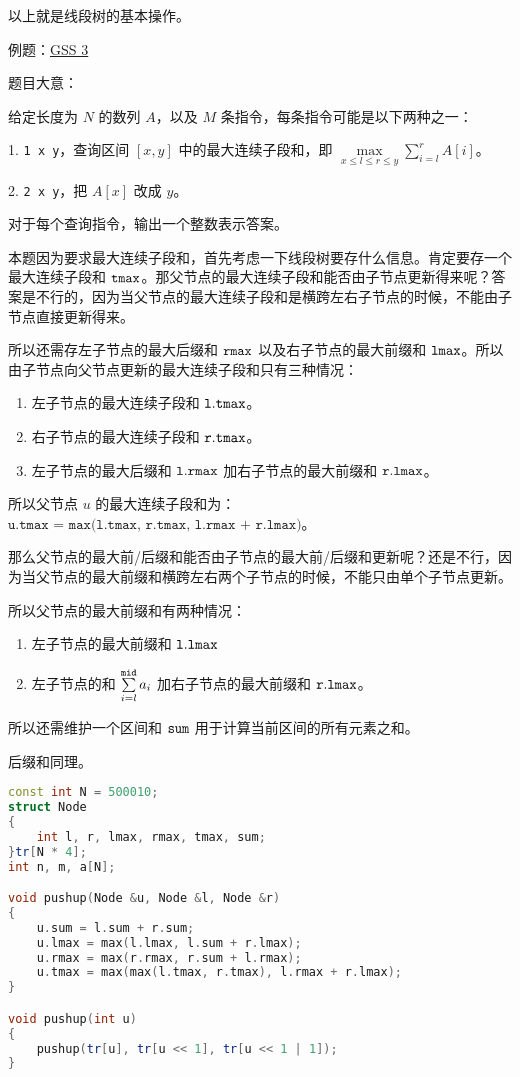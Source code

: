 以上就是线段树的基本操作。

例题：\href{https://www.spoj.com/problems/GSS3/}{GSS 3}

题目大意：

给定长度为 $N$ 的数列 $A$，以及 $M$ 条指令，每条指令可能是以下两种之一：

1.  \verb|1 x y|，查询区间 $[x,y]$ 中的最大连续子段和，即 $\max\limits_{x \le l \le r \le y}${$\sum\limits^r_{i=l} A[i]$}。

2.  \verb|2 x y|，把 $A[x]$ 改成 $y$。

对于每个查询指令，输出一个整数表示答案。


本题因为要求最大连续子段和，首先考虑一下线段树要存什么信息。肯定要存一个最大连续子段和 $\tt tmax$。那父节点的最大连续子段和能否由子节点更新得来呢？答案是不行的，因为当父节点的最大连续子段和是横跨左右子节点的时候，不能由子节点直接更新得来。

所以还需存左子节点的最大后缀和 $\tt rmax$ 以及右子节点的最大前缀和 $\tt lmax$。所以由子节点向父节点更新的最大连续子段和只有三种情况：

\begin{enumerate}
\item 左子节点的最大连续子段和 $\tt l.tmax$。
\item 右子节点的最大连续子段和 $\tt r.tmax$。
\item 左子节点的最大后缀和 $\tt l.rmax$ 加右子节点的最大前缀和 $\tt r.lmax$。
\end{enumerate}

所以父节点 $u$ 的最大连续子段和为：$\texttt{u.tmax = max(l.tmax, r.tmax, l.rmax + r.lmax)}$。

那么父节点的最大前/后缀和能否由子节点的最大前/后缀和更新呢？还是不行，因为当父节点的最大前缀和横跨左右两个子节点的时候，不能只由单个子节点更新。

所以父节点的最大前缀和有两种情况：

\begin{enumerate}
\item 左子节点的最大前缀和 $\tt l.lmax$
\item 左子节点的和 $\sum\limits^{\tt mid}_{i = l}a_i$ 加右子节点的最大前缀和 $\tt r.lmax$。
\end{enumerate}

所以还需维护一个区间和 $\tt sum$ 用于计算当前区间的所有元素之和。

后缀和同理。
\begin{lstlisting}[language=cpp]
const int N = 500010;
struct Node
{
    int l, r, lmax, rmax, tmax, sum;
}tr[N * 4];
int n, m, a[N];

void pushup(Node &u, Node &l, Node &r)
{
    u.sum = l.sum + r.sum;
    u.lmax = max(l.lmax, l.sum + r.lmax);
    u.rmax = max(r.rmax, r.sum + l.rmax);
    u.tmax = max(max(l.tmax, r.tmax), l.rmax + r.lmax);
}

void pushup(int u)
{
    pushup(tr[u], tr[u << 1], tr[u << 1 | 1]);
}
\end{lstlisting}

